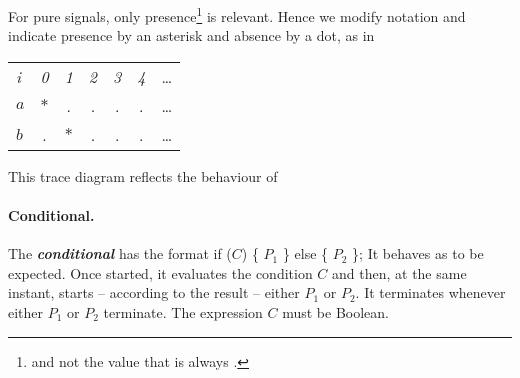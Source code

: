 For pure signals, only presence\footnote{and not the value that is always .} is relevant. Hence we modify notation and indicate presence by
an  asterisk \pp{*} and absence by a dot, as in 
\begin{center}
  \leavevmode
  \begin{tabular}[]{l@{\quad}||@{\quad} cccccc}
    \hline\hline   
     \hbox{{\footnotesize \textit{i}}} &{\footnotesize \textit{0}}
     &{\footnotesize \textit{1}}&{\footnotesize \textit{2}}
     &{\footnotesize \textit{3}}&{\footnotesize \textit{4}}&\ldots
   \\  
    \hbox{$a$} &$*$&.&.&.&.&\ldots
   \\
    \hbox{$b$} &.&$*$&.&.&.&\ldots
   \\   \hline\hline
  \end{tabular}
\end{center}
This trace diagram reflects the behaviour of
% 
%

\paragraph{Conditional.} The \textbf{\emph{conditional}}
 has the format
% 
\BEP
               if ($C$) \{ $P_{1}$ \} else \{ $P_{2}$ \};
\EEP
% 
It behaves as to be expected. Once started, it evaluates the condition $C$ and then, at the same instant, starts -- according to the result -- either $P_{1}$ or $P_{2}$. It terminates whenever either $P_{1}$ or $P_{2}$ terminate. The expression $C$ must be Boolean.

